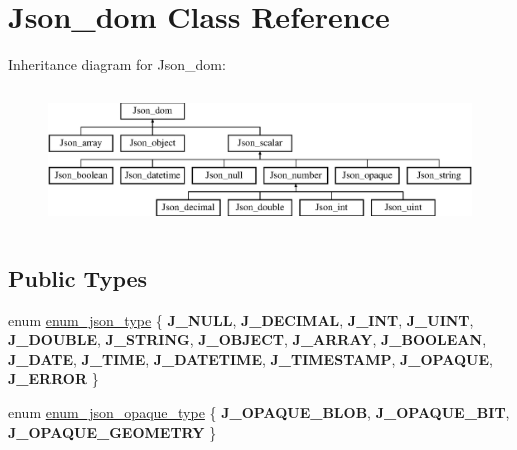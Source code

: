 \hypertarget{classJson__dom}{}\section{Json\+\_\+dom Class Reference}
\label{classJson__dom}
Inheritance diagram for Json\+\_\+dom\+:\begin{figure}[H]
\begin{center}
\leavevmode
\includegraphics[height=3.733333cm]{classJson__dom}
\end{center}
\end{figure}
\subsection*{Public Types}
\begin{DoxyCompactItemize}
\item 
enum \mbox{\hyperlink{classJson__dom_af37eed7dfe1da1d6507d3ab85320eb03}{enum\+\_\+json\+\_\+type}} \{ \newline
{\bfseries J\+\_\+\+N\+U\+LL}, 
{\bfseries J\+\_\+\+D\+E\+C\+I\+M\+AL}, 
{\bfseries J\+\_\+\+I\+NT}, 
{\bfseries J\+\_\+\+U\+I\+NT}, 
\newline
{\bfseries J\+\_\+\+D\+O\+U\+B\+LE}, 
{\bfseries J\+\_\+\+S\+T\+R\+I\+NG}, 
{\bfseries J\+\_\+\+O\+B\+J\+E\+CT}, 
{\bfseries J\+\_\+\+A\+R\+R\+AY}, 
\newline
{\bfseries J\+\_\+\+B\+O\+O\+L\+E\+AN}, 
{\bfseries J\+\_\+\+D\+A\+TE}, 
{\bfseries J\+\_\+\+T\+I\+ME}, 
{\bfseries J\+\_\+\+D\+A\+T\+E\+T\+I\+ME}, 
\newline
{\bfseries J\+\_\+\+T\+I\+M\+E\+S\+T\+A\+MP}, 
{\bfseries J\+\_\+\+O\+P\+A\+Q\+UE}, 
{\bfseries J\+\_\+\+E\+R\+R\+OR}
 \}
\item 
enum \mbox{\hyperlink{classJson__dom_afb217ce26a75cf2a34494e19e2212842}{enum\+\_\+json\+\_\+opaque\+\_\+type}} \{ {\bfseries J\+\_\+\+O\+P\+A\+Q\+U\+E\+\_\+\+B\+L\+OB}, 
{\bfseries J\+\_\+\+O\+P\+A\+Q\+U\+E\+\_\+\+B\+IT}, 
{\bfseries J\+\_\+\+O\+P\+A\+Q\+U\+E\+\_\+\+G\+E\+O\+M\+E\+T\+RY}
 \}
\end{DoxyCompactItemize}

